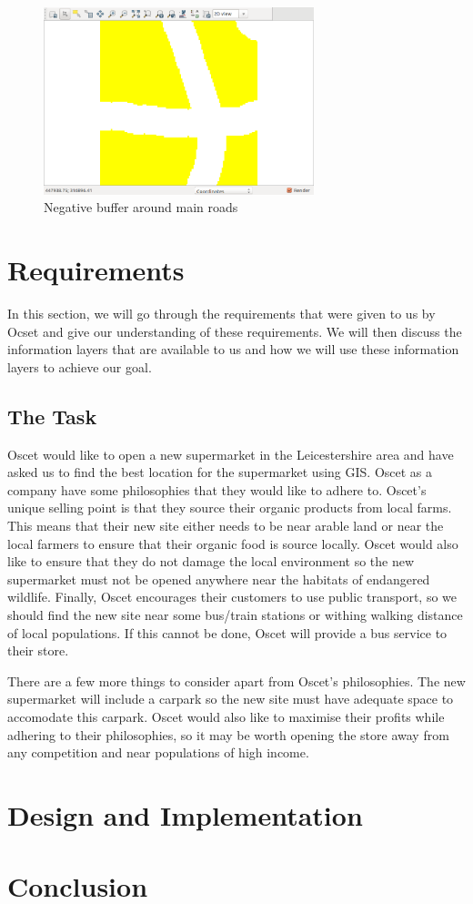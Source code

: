 \documentclass[a4paper,11pt,parskip]{scrartcl}
\begin{document}
\begin{figure}[H]
  \centering
  \includegraphics[width=0.7\textwidth]{pictures/negativeMainRoadBuf.png}
  \caption{Negative buffer around main roads}
  \label{fig:negativeBufferMainRoadMap}
\end{figure}

\section{Requirements}

In this section, we will go through the requirements that were given to us by Ocset and give our understanding
of these requirements. We will then discuss the information layers that are available to us and how we will
use these information layers to achieve our goal.

\subsection{The Task}
Oscet would like to open a new supermarket in the Leicestershire area and have asked us to find the best location
for the supermarket using GIS. Oscet as a company have some philosophies that they would like to adhere to. Oscet's
unique selling point is that they source their organic products from local farms. This means that their new
site either needs to be near arable land or near the local farmers to ensure that their organic food is source locally.
Oscet would also like to ensure that they do not damage the local environment so the new supermarket must not be
opened anywhere near the habitats of endangered wildlife. Finally, Oscet encourages their customers to use public
transport, so we should find the new site near some bus/train stations or withing walking distance of local populations.
If this cannot be done, Oscet will provide a bus service to their store.

There are a few more things to consider apart from Oscet's philosophies. The new supermarket will include a carpark so
the new site must have adequate space to accomodate this carpark. Oscet would also like to maximise their
profits while adhering to their philosophies, so it may be worth opening the store away from any competition and
near populations of high income.

\section{Design and Implementation}

\section{Conclusion}

\pagebreak

\printbibliography
\end{document}
